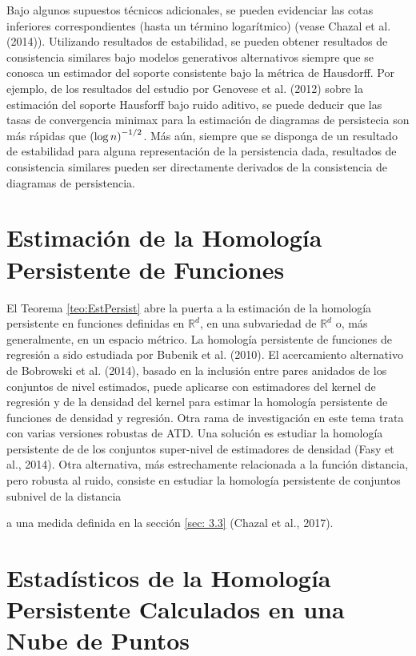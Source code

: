 Bajo algunos supuestos t\'ecnicos adicionales, se pueden evidenciar las cotas inferiores correspondientes
(hasta un t\'ermino logar\'itmico) (vease Chazal et al. (2014)\cite{Chazal2014b}).
Utilizando resultados de estabilidad, se pueden obtener resultados de consistencia similares
bajo modelos generativos alternativos siempre que se conosca un estimador del soporte
consistente bajo la m\'etrica de Hausdorff.
Por ejemplo, de los resultados del estudio por Genovese et al. (2012)\cite{Genovese2012}
sobre la estimaci\'on del soporte Hausforff bajo ruido aditivo,
se puede deducir que las tasas de convergencia minimax para la estimaci\'on de diagramas de persistecia
son m\'as r\'apidas que $\left(\log n\right)^{-1/2}$.
M\'as a\'un, siempre que se disponga de un resultado de estabilidad para alguna representaci\'on de la persistencia dada,
resultados de consistencia similares pueden ser directamente derivados de la consistencia de diagramas de persistencia.

\section*{Estimaci\'on de la Homolog\'ia Persistente de Funciones}

El Teorema \ref{teo:EstPersist} abre la puerta a la estimaci\'on
de la homolog\'ia persistente en funciones definidas en $\mathbb{R}^{d}$,
en una subvariedad de $\mathbb{R}^{d}$ o, m\'as generalmente, en un espacio m\'etrico.
La homolog\'ia persistente de funciones de regresi\'on a sido estudiada por
Bubenik et al. (2010)\cite{Bubenik2010}.
El acercamiento alternativo de Bobrowski et al. (2014)\cite{Bobrowski2014},
basado en la inclusi\'on entre pares anidados de los conjuntos de nivel estimados,
puede aplicarse con estimadores del kernel de regresi\'on y de la densidad del kernel
para estimar la homolog\'ia persistente de funciones de densidad y regresi\'on.
Otra rama de investigaci\'on en este tema trata con varias versiones robustas de ATD.
Una soluci\'on es estudiar la homolog\'ia persistente de de los conjuntos super-nivel
de estimadores de densidad (Fasy et al., 2014\cite{Fasy2014b}).
Otra alternativa, m\'as estrechamente relacionada a la funci\'on distancia, pero robusta al ruido,
consiste en estudiar la homolog\'ia persistente de conjuntos subnivel de la distancia

a una medida definida en la secci\'on \ref{sec: 3.3} (Chazal et al., 2017\cite{Chazal2017}).
\section{Estad\'isticos de la Homolog\'ia Persistente Calculados en una Nube de Puntos}

